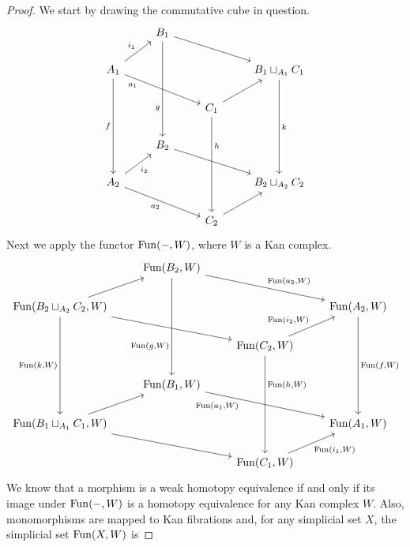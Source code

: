 \documentclass[a4paper,11pt,openany]{scrartcl}
\begin{document}
~\\
\begin{proof}
    We start by drawing the commutative cube in question.
    \[\begin{tikzcd}
        & {B_1} \\
        {A_1} &&& {B_1\sqcup_{A_1}C_1} \\
        && {C_1} \\
        & {B_2} \\
        {A_2} &&& {B_2\sqcup_{A_2}C_2} \\
        && {C_2}
        \arrow["h"{pos=0.3}, from=3-3, to=6-3, crossing over]
        \arrow["{a_2}"', from=5-1, to=6-3]
        \arrow[from=6-3, to=5-4]
        \arrow["{i_2}"', from=5-1, to=4-2]
        \arrow[from=4-2, to=5-4]
        \arrow["k", from=2-4, to=5-4]
        \arrow["f"', from=2-1, to=5-1]
        \arrow["{a_1}"'{pos=0.2}, from=2-1, to=3-3, crossing over]
        \arrow[from=1-2, to=2-4]
        \arrow[from=3-3, to=2-4]
        \arrow["{i_1}", from=2-1, to=1-2]
        \arrow["g"'{pos=0.7}, from=1-2, to=4-2]
    \end{tikzcd}\]
    Next we apply the functor $\operatorname{Fun}(-,W)$, where $W$ is a Kan complex.
    \[\begin{tikzcd}
        & {\Fun(B_2,W)} \\
        {\Fun(B_2\sqcup_{A_2}C_2,W)} &&& {\Fun(A_2,W)} \\
        && {\Fun(C_2,W)} \\
        & {\Fun(B_1,W)} \\
        {\Fun(B_1\sqcup_{A_1}C_1,W)} &&& {\Fun(A_1,W)} \\
        && {\Fun(C_1,W)}
        \arrow["{\Fun(h,W)}"{pos=0.3}, from=3-3, to=6-3, crossing over]
        \arrow[from=5-1, to=6-3]
        \arrow["{\Fun(i_1,W)}"', from=6-3, to=5-4]
        \arrow[from=5-1, to=4-2]
        \arrow["{\Fun(a_1,W)}"'{pos=0.3}, from=4-2, to=5-4]
        \arrow["{\Fun(f,W)}", from=2-4, to=5-4]
        \arrow["{\Fun(k,W)}"', from=2-1, to=5-1]
        \arrow[from=2-1, to=3-3, crossing over]
        \arrow["{\Fun(a_2,W)}", from=1-2, to=2-4]
        \arrow["{\Fun(i_2,W)}", from=3-3, to=2-4]
        \arrow[from=2-1, to=1-2]
        \arrow["{\Fun(g,W)}"'{pos=0.7}, from=1-2, to=4-2]
    \end{tikzcd}\]
    We know that a morphism is a weak homotopy equivalence if and only if its
    image under $\operatorname{Fun}(-,W)$ is a homotopy equivalence for any Kan complex
    $W$. Also, monomorphisms are mapped to Kan fibrations and, for any
    simplicial set $X$, the simplicial set $\operatorname{Fun}(X,W)$ is

\end{proof}
\end{document}
